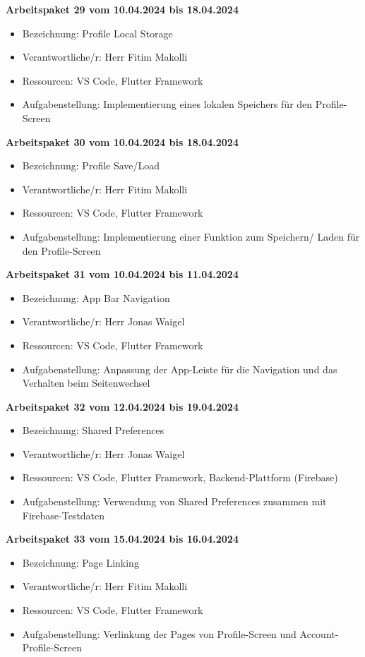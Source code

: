 \textbf{Arbeitspaket 29 vom 10.04.2024 bis 18.04.2024}
\begin{itemize}[itemsep=0pt]
    \item{Bezeichnung: Profile Local Storage} 
	\item{Verantwortliche/r: Herr Fitim Makolli} 
	\item{Ressourcen: VS Code, Flutter Framework} 
    \item{Aufgabenstellung: Implementierung eines lokalen Speichers für den Profile-Screen}
\end{itemize}

\textbf{Arbeitspaket 30 vom 10.04.2024 bis 18.04.2024}
\begin{itemize}[itemsep=0pt]
    \item{Bezeichnung: Profile Save/Load} 
	\item{Verantwortliche/r: Herr Fitim Makolli} 
	\item{Ressourcen: VS Code, Flutter Framework} 
    \item{Aufgabenstellung: Implementierung einer Funktion zum Speichern/ Laden für den Profile-Screen}
\end{itemize}

\newpage
\textbf{Arbeitspaket 31 vom 10.04.2024 bis 11.04.2024}
\begin{itemize}[itemsep=0pt]
    \item{Bezeichnung: App Bar Navigation} 
	\item{Verantwortliche/r: Herr Jonas Waigel} 
	\item{Ressourcen: VS Code, Flutter Framework} 
    \item{Aufgabenstellung: Anpassung der App-Leiste für die Navigation und das Verhalten beim Seitenwechsel}
\end{itemize} 

\textbf{Arbeitspaket 32 vom 12.04.2024 bis 19.04.2024}
\begin{itemize}[itemsep=0pt]
    \item{Bezeichnung: Shared Preferences} 
	\item{Verantwortliche/r: Herr Jonas Waigel} 
	\item{Ressourcen: VS Code, Flutter Framework, Backend-Plattform (Firebase)}
    \item{Aufgabenstellung: Verwendung von Shared Preferences zusammen mit Firebase-Testdaten} 
\end{itemize}

\textbf{Arbeitspaket 33 vom 15.04.2024 bis 16.04.2024}
\begin{itemize}[itemsep=0pt]
    \item{Bezeichnung: Page Linking} 
	\item{Verantwortliche/r: Herr Fitim Makolli} 
	\item{Ressourcen: VS Code, Flutter Framework} 
    \item{Aufgabenstellung: Verlinkung der Pages von Profile-Screen und Account-Profile-Screen}
\end{itemize}

